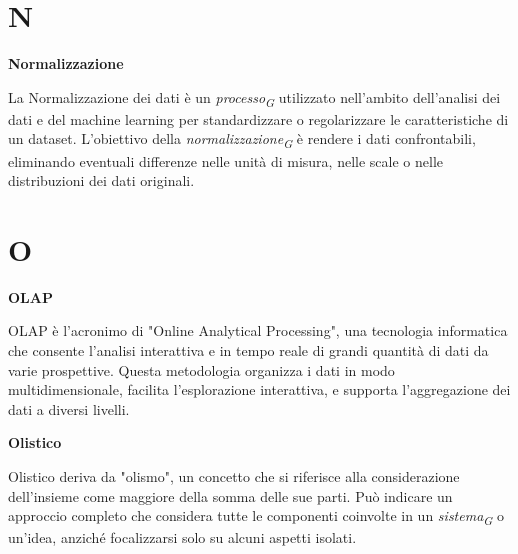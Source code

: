 \documentclass{article}
\begin{document}
\pagebreak
\section*{N}
{}

\vspace{0.4cm}

\textbf{Normalizzazione}

\vspace{0.1cm}

La Normalizzazione dei dati è un \textit{processo}\textsubscript{\textit{G}} utilizzato nell'ambito dell'analisi dei dati e del machine learning per standardizzare o regolarizzare le caratteristiche di un dataset. L'obiettivo della \textit{normalizzazione}\textsubscript{\textit{G}} è rendere i dati confrontabili, eliminando eventuali differenze nelle unità di misura, nelle scale o nelle distribuzioni dei dati originali.

\pagebreak
\section*{O}
{}

\vspace{0.4cm}

\textbf{OLAP}

\vspace{0.1cm}

OLAP è l'acronimo di "Online Analytical Processing", una tecnologia informatica che consente l'analisi interattiva e in tempo reale di grandi quantità di dati da varie prospettive. Questa metodologia organizza i dati in modo multidimensionale, facilita l'esplorazione interattiva, e supporta l'aggregazione dei dati a diversi livelli.

\vspace{0.4cm}

\textbf{Olistico}

\vspace{0.1cm}

Olistico deriva da "olismo", un concetto che si riferisce alla considerazione dell'insieme come maggiore della somma delle sue parti. Può indicare un approccio completo che considera tutte le componenti coinvolte in un \textit{sistema}\textsubscript{\textit{G}} o un'idea, anziché focalizzarsi solo su alcuni aspetti isolati. 

\vspace{0.4cm}
\end{document}
